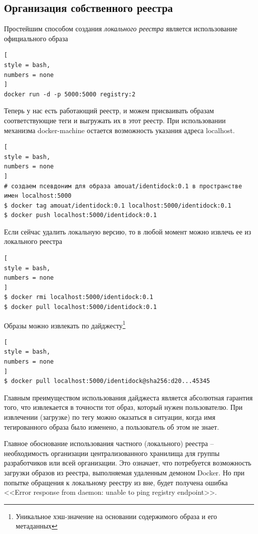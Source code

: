 \documentclass[%
	11pt,
	a4paper,
	utf8,
		]{article}
\begin{document}
\subsection{Организация собственного реестра}

Простейшим способом создания \emph{локального реестра} является использование официального образа
\begin{lstlisting}[
style = bash,
numbers = none
]
docker run -d -p 5000:5000 registry:2
\end{lstlisting}

Теперь у нас есть работающий реестр, и можем присваивать образам соответствующие теги и выгружать их в этот реестр. При использовании механизма docker-machine остается возможность указания адреса localhost.
\begin{lstlisting}[
style = bash,
numbers = none
]
# создаем псевдоним для образа amouat/identidock:0.1 в пространстве имен localhost:5000
$ docker tag amouat/identidock:0.1 localhost:5000/identidock:0.1
$ docker push localhost:5000/identidock:0.1
\end{lstlisting}

Если сейчас удалить локальную версию, то в любой момент можно извлечь ее из локального реестра
\begin{lstlisting}[
style = bash,
numbers = none
]
$ docker rmi localhost:5000/identidock:0.1
$ docker pull localhost:5000/identidock:0.1
\end{lstlisting}

Образы можно извлекать по дайджесту\footnote{Уникальное хэш-значение на основании содержимого образа и его метаданных}
\begin{lstlisting}[
style = bash,
numbers = none
]
$ docker pull localhost:5000/identidock@sha256:d20...45345
\end{lstlisting}

Главным преимуществом использования дайджеста является абсолютная гарантия того, что извлекается в точности тот образ, который нужен пользователю. При извлечении (загрузке) по тегу можно оказаться в ситуации, когда имя тегированного образа было изменено, а пользователь об этом не знает.

Главное обоснование использования частного (локального) реестра -- необходимость организации централизованного хранилища для группы разработчиков или всей организации. Это означает, что потребуется возможность загрузки образов из реестра, выполняемая удаленным демоном Docker. Но при попытке обращения к локальному реестру из вне, будет получена ошибка <<Error response from daemon: unable to ping registry endpoint>>.
\end{document}
